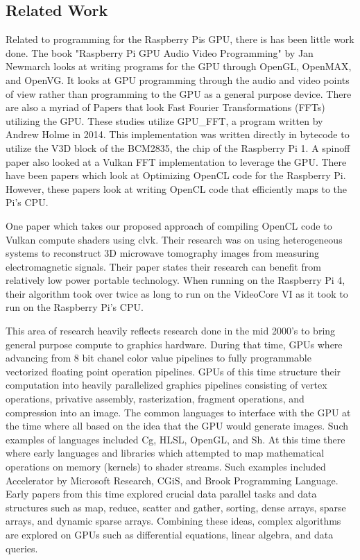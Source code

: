 \documentclass[conference]{IEEEtran}
\begin{document}
  \subsection{Related Work}

 Related to programming for the Raspberry Pis GPU, there is has been little work done. 
 The book "Raspberry Pi GPU Audio Video Programming" by Jan Newmarch looks at writing 
 programs for the GPU through OpenGL, OpenMAX, and OpenVG\cite{newmarch2017raspberry}. It looks at GPU programming 
 through the audio and video points of view rather than programming to the GPU as 
 a general purpose device. There are also a myriad of Papers that look Fast Fourier Transformations 
 (FFTs) utilizing the GPU. These studies utilize GPU\_FFT, a program written by Andrew Holme in 2014\cite{holme_gpu_fft}.
 This implementation was written directly in bytecode to utilize the V3D block of the BCM2835, the chip 
 of the Raspberry Pi 1. A spinoff paper also looked at a Vulkan FFT implementation to leverage the GPU\cite{he_comparing_2018}. 
 There have been papers which look at Optimizing OpenCL code for the Raspberry Pi. However, these papers
 look at writing OpenCL code that efficiently maps to the Pi's CPU.

 One paper which takes our proposed approach of compiling OpenCL code to Vulkan compute shaders using clvk\cite{vasileiou_accelerated_nodate}.
 Their research was on using heterogeneous systems to reconstruct 3D microwave tomography images from measuring 
 electromagnetic signals. Their paper states their research can benefit from relatively low power portable technology. 
 When running on the Raspberry Pi 4, their algorithm took over twice as long to run on the VideoCore VI as it took 
 to run on the Raspberry Pi's CPU. 

 This area of research heavily reflects research done in the mid 2000's to bring general purpose compute to 
 graphics hardware. During that time, GPUs where advancing from 8 bit chanel color value pipelines to 
 fully programmable vectorized floating point operation pipelines\cite{owens_survey_2007}. GPUs of this time 
 structure their computation into heavily parallelized graphics pipelines consisting of vertex operations, 
 privative assembly, rasterization, fragment operations, and compression into an image. The common languages to 
 interface with the GPU at the time where all based on the idea that the GPU would generate images. Such examples 
 of languages included Cg, HLSL, OpenGL, and Sh. At this time there where early languages and libraries which attempted 
 to map mathematical operations on memory (kernels) to shader streams.  Such examples included Accelerator by Microsoft 
 Research, CGiS, and Brook Programming Language. Early papers from this time explored crucial data parallel 
 tasks and data structures such as map, reduce, scatter and gather, sorting, dense arrays, sparse arrays, 
 and dynamic sparse arrays. Combining these ideas, complex algorithms are explored on GPUs such as differential 
 equations, linear algebra, and data queries. 
 
\end{document}
